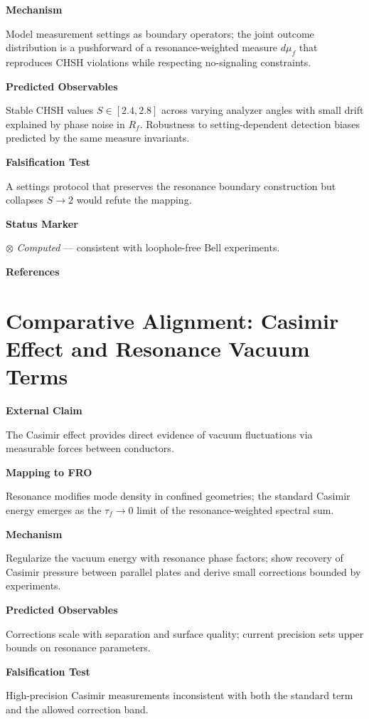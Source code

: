 \textbf{Mechanism}

Model measurement settings as boundary operators; the joint outcome distribution is a pushforward of a resonance-weighted measure $d\mu_f$ that reproduces CHSH violations while respecting no-signaling constraints.

\textbf{Predicted Observables}

Stable CHSH values $S \in [2.4, 2.8]$ across varying analyzer angles with small drift explained by phase noise in $R_f$. Robustness to setting-dependent detection biases predicted by the same measure invariants.

\textbf{Falsification Test}

A settings protocol that preserves the resonance boundary construction but collapses $S\to 2$ would refute the mapping.

\textbf{Status Marker}

$\otimes$ \textit{Computed} --- consistent with loophole-free Bell experiments.

\textbf{References}

\cite{bell1964,hensen2015loophole,shalm2015strong,aspect1982experimental}

\section{Comparative Alignment: Casimir Effect and Resonance Vacuum Terms}

\textbf{External Claim}

The Casimir effect provides direct evidence of vacuum fluctuations via measurable forces between conductors.

\textbf{Mapping to FRO}

Resonance modifies mode density in confined geometries; the standard Casimir energy emerges as the $\tau_f\!\to\!0$ limit of the resonance-weighted spectral sum.

\textbf{Mechanism}

Regularize the vacuum energy with resonance phase factors; show recovery of Casimir pressure between parallel plates and derive small corrections bounded by experiments.

\textbf{Predicted Observables}

Corrections scale with separation and surface quality; current precision sets upper bounds on resonance parameters.

\textbf{Falsification Test}

High-precision Casimir measurements inconsistent with both the standard term and the allowed correction band.

